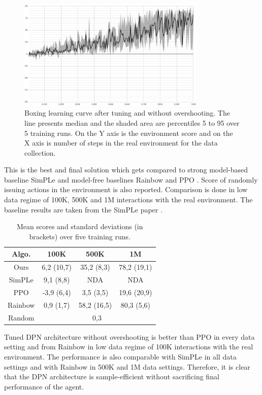 \begin{figure}[H]
\includegraphics[width=0.8\textwidth,keepaspectratio]{figures/PlaNet/Boxing_without_overshooting.png}
\caption[Boxing learning curve after tuning and without overshooting]{Boxing learning curve after tuning and without overshooting. The line presents median and the shaded area are percentiles 5 to 95 over 5 training runs. On the Y axis is the environment score and on the X axis is number of steps in the real environment for the data collection.}
\label{Fig.Boxing_without_overshooting}
\end{figure}

This is the best and final solution which gets compared to strong model-based baseline SimPLe \cite{Algo.SimPLe} and model-free baselines Rainbow \cite{Algo.Rainbow} and PPO \cite{Algo.PPO}. Score of randomly issuing actions in the environment is also reported. Comparison is done in low data regime of 100K, 500K and 1M interactions with the real environment. The baseline results are taken from the SimPLe paper \cite{Algo.SimPLe}.

\begin{table}[H]
\centering
\begin{tabular}{|c | c c c|} 
\hline
Algo.   & 100K        & 500K        & 1M          \\
\hline
Ours    &  6,2 (10,7) & 35,2  (8,3) & 78,2 (19,1) \\ 
SimPLe  &  9,1  (8,8) & NDA         & NDA         \\
PPO     & -3,9  (6,4) &  3,5  (3,5) & 19,6 (20,9) \\
Rainbow &  0,9  (1,7) & 58,2 (16,5) & 80,3  (5,6) \\
Random  & \multicolumn{3}{c|}{0,3}                \\
\hline
\end{tabular}
\caption[Results comparison]{Mean scores and standard deviations (in brackets) over five training runs.}
\label{Table.Results}
\end{table}

Tuned DPN architecture without overshooting is better than PPO in every data setting and from Rainbow in low data regime of 100K interactions with the real environment. The performance is also comparable with SimPLe in all data settings and with Rainbow in 500K and 1M data settings. Therefore, it is clear that the DPN architecture is sample-efficient without sacrificing final performance of the agent.
